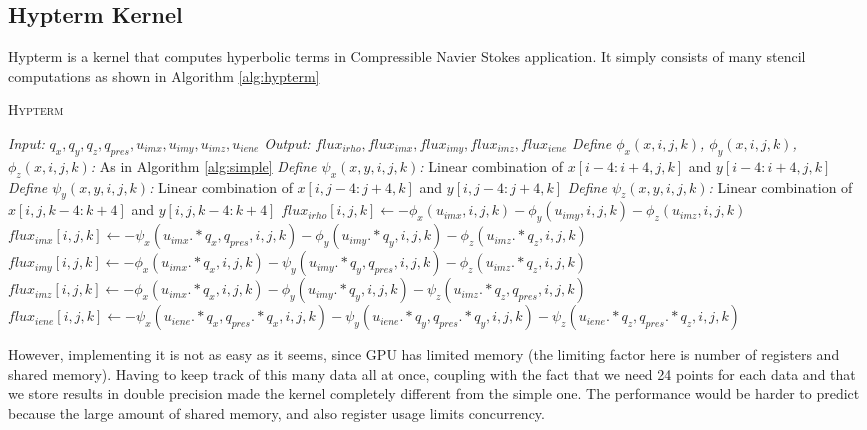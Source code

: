 \subsection{Hypterm Kernel}
Hypterm is a kernel that computes hyperbolic terms in Compressible Navier Stokes application. It simply consists of many stencil computations as shown in Algorithm \ref{alg:hypterm}
\begin{algorithm}
\caption{\textsc{Hypterm}}
\label{alg:hypterm}
\begin{algorithmic}[1]
\State \emph{Input:} $q_x, q_y, q_z, q_{pres}, u_{imx}, u_{imy}, u_{imz}, u_{iene}$
\State \emph{Output:} $flux_{irho}, flux_{imx}, flux_{imy}, flux_{imz}, flux_{iene}$
\State \emph{Define $\phi_x(x,i,j,k)$, $\phi_y(x,i,j,k)$, $\phi_z(x,i,j,k)$:} As in Algorithm \ref{alg:simple}
\State \emph{Define $\psi_x(x,y,i,j,k)$:} Linear combination of $x[i-4:i+4,j,k]$ and $y[i-4:i+4,j,k]$
\State \emph{Define $\psi_y(x,y,i,j,k)$:} Linear combination of $x[i,j-4:j+4,k]$ and $y[i,j-4:j+4,k]$
\State \emph{Define $\psi_z(x,y,i,j,k)$:} Linear combination of $x[i,j,k-4:k+4]$ and $y[i,j,k-4:k+4]$
	\State $flux_{irho}[i,j,k] \leftarrow -\phi_x(u_{imx},i,j,k) - \phi_y(u_{imy},i,j,k) - \phi_z(u_{imz},i,j,k)$
	\State $flux_{imx}[i,j,k] \leftarrow -\psi_x(u_{imx}.*q_x,q_{pres}, i,j,k) - \phi_y(u_{imy}.*q_y,i,j,k) - \phi_z(u_{imz}.*q_z,i,j,k)$
	\State $flux_{imy}[i,j,k] \leftarrow -\phi_x(u_{imx}.*q_x,i,j,k) - \psi_y(u_{imy}.*q_y,q_{pres},i,j,k) - \phi_z(u_{imz}.*q_z,i,j,k)$
	\State $flux_{imz}[i,j,k] \leftarrow -\phi_x(u_{imx}.*q_x,i,j,k) - \phi_y(u_{imy}.*q_y,i,j,k) - \psi_z(u_{imz}.*q_z,q_{pres},i,j,k)$
	\State $flux_{iene}[i,j,k] \leftarrow -\psi_x(u_{iene}.*q_x,q_{pres}.*q_x,i,j,k) - \psi_y(u_{iene}.*q_y,q_{pres}.*q_y,i,j,k) - \psi_z(u_{iene}.*q_z,q_{pres}.*q_z,i,j,k)$
\EndFor
\end{algorithmic}
\end{algorithm}

However, implementing it is not as easy as it seems, since GPU has limited memory (the limiting factor here is number of registers and shared memory). Having to keep track of this many data all at once, coupling with the fact that we need 24 points for each data and that we store results in double precision made the kernel completely different from the simple one. The performance would be harder to predict because the large amount of shared memory, and also register usage limits concurrency.

